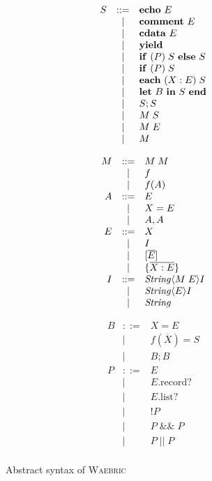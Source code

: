 \documentclass[a4paper]{article}
\def\waebric{\textsc{Waebric}\xspace}
\def\V#1{\ensuremath{\mbox{\textit{#1}}}}
\begin{document}
\begin{figure}
\begin{minipage}[t]{0.33\linewidth}
\[
\begin{array}{rcl}
S & ::= & \text{\textbf{echo} }E \\
& | & \text{\textbf{comment} }E \\
& | & \text{\textbf{cdata} }E\\
& | & \text{\textbf{yield}}\\
& | & \text{\textbf{if} }(P)\;S \text{ \textbf{else} }S\\
& | & \text{\textbf{if} }(P)\;S \\
& | & \text{\textbf{each} }(X: E)\;S\\
& | & \text{\textbf{let} }B\text{ \textbf{in} }S\text{ \textbf{end}}\\
& | & S; S\\
& | & M\; S\\
& | & M\; E\\
& | & M
\end{array}
\]
\end{minipage}
\begin{minipage}[t]{0.33\linewidth}
\[
\begin{array}{rcl}
M & ::= & M\;M\\
& | & f\\
& | & f(A)\\
A & ::= & E\\
& | &X = E\\
& | & A, A\\
E & ::= & X \\
& | & I \\
& | & [\overline{E}]\\
& | & \{ \overline{X : E}\}\\
I & ::= & \V{String} \langle M\; E \rangle I\\
  & | & \V{String} \langle E \rangle I\\
  & | & \V{String}
\end{array}
\]
\end{minipage}
\begin{minipage}[t]{0.33\linewidth}
\[
\begin{array}{rcl}
B & ::= & X = E \\
& | & f(\overline{X}) = S\\
& | & B ; B\\
P & ::= & E\\
& | & E.\text{record?}\\
& | & E.\text{list?}\\
& | & !P \\
& | & P\; \&\&\; P\\
& | & P\; ||\; P\\
\end{array}
\]
\end{minipage}
\caption{Abstract syntax of \waebric\label{FIG:abstract-syntax}}
\end{figure}
\end{document}
